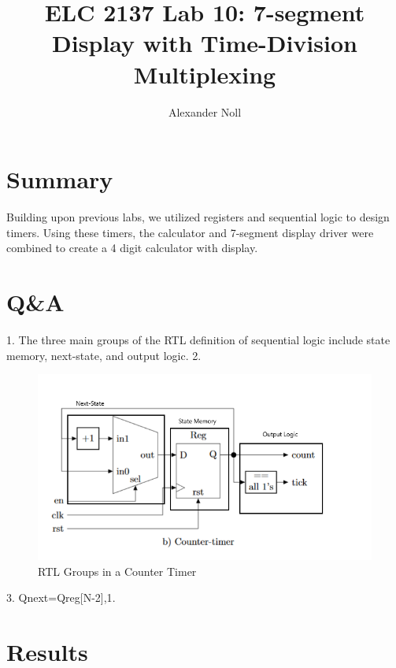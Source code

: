 \documentclass[11pt]{article}
\begin{document}
\title{ELC 2137 Lab 10: 7-segment Display with Time-Division Multiplexing}
\author{Alexander Noll}

\maketitle


\section*{Summary}

Building upon previous labs, we utilized registers and sequential logic to design timers. Using these timers, the calculator and 7-segment display driver were combined to create a 4 digit calculator with display. 


\section*{Q\&A}

1. The three main groups of the RTL definition of sequential logic include state memory, next-state, and output logic.
2. 
\begin{figure}[ht]\centering
	\includegraphics[width=1.0\textwidth,trim=0 0mm 0 0,clip]{Q2Pic}
	\caption{RTL Groups in a Counter Timer}
\end{figure}
3. Qnext={Qreg[N-2],1}.



\clearpage

\section*{Results}
\end{document}
